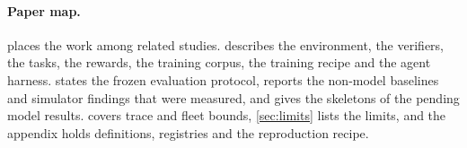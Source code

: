 \paragraph{Paper map.}
 places the work among related studies.  describes the
environment, the verifiers, the tasks, the rewards, the training corpus, the training recipe and the agent harness.
 states the frozen evaluation protocol, reports the non-model baselines and
simulator findings that were measured, and gives the skeletons of the pending model results.
 covers trace and fleet bounds, \cref{sec:limits} lists the limits, and the appendix
holds definitions, registries and the reproduction recipe.

